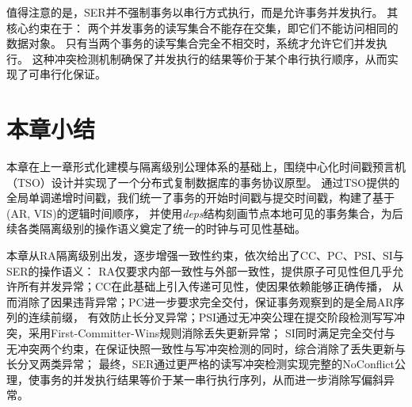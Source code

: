 值得注意的是，SER并不强制事务以串行方式执行，而是允许事务并发执行。
其核心约束在于：
两个并发事务的读写集合不能存在交集，即它们不能访问相同的数据对象。
只有当两个事务的读写集合完全不相交时，系统才允许它们并发执行。
这种冲突检测机制确保了并发执行的结果等价于某个串行执行顺序，从而实现了可串行化保证。

\section{本章小结}

本章在上一章形式化建模与隔离级别公理体系的基础上，围绕中心化时间戳预言机（TSO）设计并实现了一个分布式复制数据库的事务协议原型。
通过TSO提供的全局单调递增时间戳，我们统一了事务的开始时间戳与提交时间戳，构建了基于(AR, VIS)的逻辑时间顺序，
并使用\textit{deps}结构刻画节点本地可见的事务集合，为后续各类隔离级别的操作语义奠定了统一的时钟与可见性基础。

本章从RA隔离级别出发，逐步增强一致性约束，依次给出了CC、PC、PSI、SI与SER的操作语义：
RA仅要求内部一致性与外部一致性，提供原子可见性但几乎允许所有并发异常；CC在此基础上引入传递可见性，使因果依赖能够正确传播，
从而消除了因果违背异常；PC进一步要求完全交付，保证事务观察到的是全局AR序列的连续前缀，
有效防止长分叉异常；PSI通过无冲突公理在提交阶段检测写写冲突，采用First-Committer-Wins规则消除丢失更新异常；
SI同时满足完全交付与无冲突两个约束，在保证快照一致性与写冲突检测的同时，综合消除了丢失更新与长分叉两类异常；
最终，SER通过更严格的读写冲突检测实现完整的NoConflict公理，使事务的并发执行结果等价于某一串行执行序列，从而进一步消除写偏斜异常。

